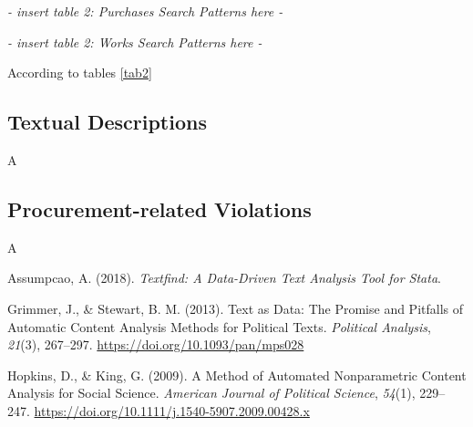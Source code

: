 \documentclass[]{article}
\theoremstyle{definition}
\theoremstyle{definition}
\theoremstyle{definition}
\theoremstyle{remark}
\begin{document}
\emph{- insert table 2: Purchases Search Patterns here -}



\emph{- insert table 2: Works Search Patterns here -}

According to tables \ref{tab2}

\hypertarget{quality2}{%
\subsection{Textual Descriptions}\label{quality2}}

A

\hypertarget{quality3}{%
\subsection{Procurement-related Violations}\label{quality3}}

A

\hypertarget{refs}{}
\leavevmode\hypertarget{ref-AssumpcaotextfindDataDrivenText2018}{}%
Assumpcao, A. (2018). \emph{Textfind: A Data-Driven Text Analysis Tool
for Stata}.

\leavevmode\hypertarget{ref-GrimmerTextDataPromise2013a}{}%
Grimmer, J., \& Stewart, B. M. (2013). Text as Data: The Promise and
Pitfalls of Automatic Content Analysis Methods for Political Texts.
\emph{Political Analysis}, \emph{21}(3), 267--297.
\url{https://doi.org/10.1093/pan/mps028}

\leavevmode\hypertarget{ref-HopkinsMethodAutomatedNonparametric2009}{}%
Hopkins, D., \& King, G. (2009). A Method of Automated Nonparametric
Content Analysis for Social Science. \emph{American Journal of Political
Science}, \emph{54}(1), 229--247.
\url{https://doi.org/10.1111/j.1540-5907.2009.00428.x}
\end{document}
